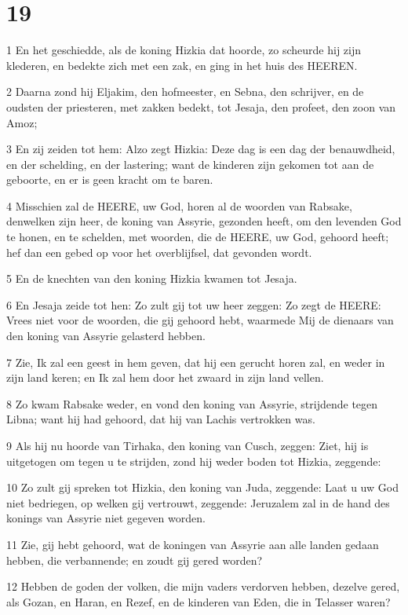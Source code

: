 \chapter{19}

\par 1 En het geschiedde, als de koning Hizkia dat hoorde, zo scheurde hij zijn klederen, en bedekte zich met een zak, en ging in het huis des HEEREN.
\par 2 Daarna zond hij Eljakim, den hofmeester, en Sebna, den schrijver, en de oudsten der priesteren, met zakken bedekt, tot Jesaja, den profeet, den zoon van Amoz;
\par 3 En zij zeiden tot hem: Alzo zegt Hizkia: Deze dag is een dag der benauwdheid, en der schelding, en der lastering; want de kinderen zijn gekomen tot aan de geboorte, en er is geen kracht om te baren.
\par 4 Misschien zal de HEERE, uw God, horen al de woorden van Rabsake, denwelken zijn heer, de koning van Assyrie, gezonden heeft, om den levenden God te honen, en te schelden, met woorden, die de HEERE, uw God, gehoord heeft; hef dan een gebed op voor het overblijfsel, dat gevonden wordt.
\par 5 En de knechten van den koning Hizkia kwamen tot Jesaja.
\par 6 En Jesaja zeide tot hen: Zo zult gij tot uw heer zeggen: Zo zegt de HEERE: Vrees niet voor de woorden, die gij gehoord hebt, waarmede Mij de dienaars van den koning van Assyrie gelasterd hebben.
\par 7 Zie, Ik zal een geest in hem geven, dat hij een gerucht horen zal, en weder in zijn land keren; en Ik zal hem door het zwaard in zijn land vellen.
\par 8 Zo kwam Rabsake weder, en vond den koning van Assyrie, strijdende tegen Libna; want hij had gehoord, dat hij van Lachis vertrokken was.
\par 9 Als hij nu hoorde van Tirhaka, den koning van Cusch, zeggen: Ziet, hij is uitgetogen om tegen u te strijden, zond hij weder boden tot Hizkia, zeggende:
\par 10 Zo zult gij spreken tot Hizkia, den koning van Juda, zeggende: Laat u uw God niet bedriegen, op welken gij vertrouwt, zeggende: Jeruzalem zal in de hand des konings van Assyrie niet gegeven worden.
\par 11 Zie, gij hebt gehoord, wat de koningen van Assyrie aan alle landen gedaan hebben, die verbannende; en zoudt gij gered worden?
\par 12 Hebben de goden der volken, die mijn vaders verdorven hebben, dezelve gered, als Gozan, en Haran, en Rezef, en de kinderen van Eden, die in Telasser waren?

